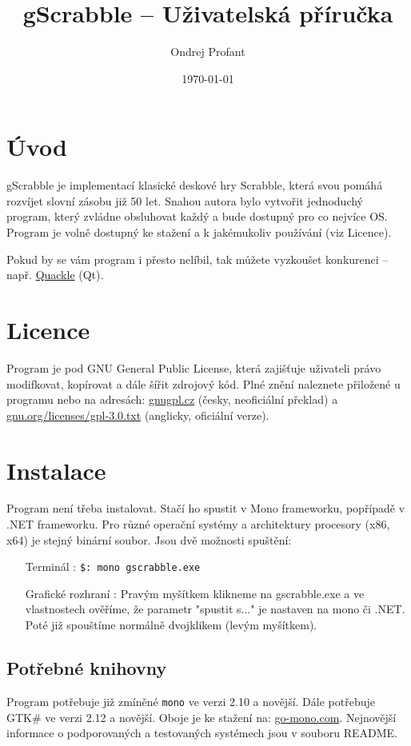 \documentclass[a4paper]{article}
\title{gScrabble -- Uživatelská příručka}
\author{Ondrej Profant}
\date{\today}
\begin{document}
\tableofcontents	


\section{Úvod}
gScrabble je implementací klasické deskové hry Scrabble, která svou pomáhá rozvíjet slovní zásobu již 50 let. Snahou autora bylo vytvořit jednoduchý program, který zvládne obsluhovat každý a bude dostupný pro co nejvíce OS. Program je volně dostupný ke stažení a k jakémukoliv používání (viz Licence).

Pokud by se vám program i přesto nelíbil, tak můžete vyzkoušet konkurenci -- např. \href{http://people.csail.mit.edu/jasonkb/quackle/}{Quackle} (Qt).
\section{Licence}
Program je pod GNU General Public License, která zajišťuje uživateli právo modifkovat, kopírovat a dále šířit zdrojový kód. Plné znění naleznete přiložené u programu nebo na adresách:
\href{http://www.gnugpl.cz/}{gnugpl.cz} (česky, neoficiální překlad) a \href{http://www.gnu.org/licenses/gpl-3.0.txt}{gnu.org/licenses/gpl-3.0.txt} (anglicky, oficiální verze).

\section{Instalace}
Program není třeba instalovat. Stačí ho spustit v Mono frameworku, popřípadě v .NET frameworku. Pro různé operační systémy a architektury procesory (x86, x64) je stejný binární soubor.
Jsou dvě možnosti spuštění:
\begin{itemize}
\item[Terminál]: \texttt{\$: mono gscrabble.exe} 
\item[Grafické rozhraní]: Pravým myšítkem klikneme na gscrabble.exe a ve vlastnostech ověříme, že parametr "spustit s..." je nastaven na mono či .NET. Poté již spouštíme normálně dvojklikem (levým myšítkem).
\end{itemize}
\subsection{Potřebné knihovny}
Program potřebuje již zmíněné \texttt{mono} ve verzi 2.10 a novější. Dále potřebuje GTK\# ve verzi 2.12 a novější. Oboje je ke stažení na: \href{http://www.go-mono.com/mono-downloads}{go-mono.com}. Nejnovější informace o podporovaných a testovaných systémech jsou v souboru README.
\end{document}
